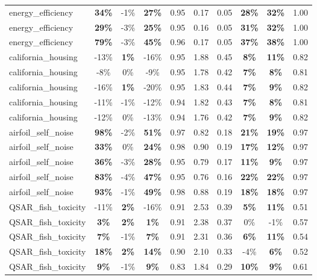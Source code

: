 \begin{table}[!htbp]
\begin{small}
\begin{sc}
{\begin{tabular}{lccccccccc}
energy\_efficiency & \textbf{34\%} & -1\% & \textbf{27\%} & 0.95 & 0.17 & 0.05 & \textbf{28\%} & \textbf{32\%} & 1.00 \\
energy\_efficiency & \textbf{29\%} & -3\% & \textbf{25\%} & 0.95 & 0.16 & 0.05 & \textbf{31\%} & \textbf{32\%} & 1.00 \\
energy\_efficiency & \textbf{79\%} & -3\% & \textbf{45\%} & 0.96 & 0.17 & 0.05 & \textbf{37\%} & \textbf{38\%} & 1.00 \\
california\_housing & -13\% & \textbf{1\%} & -16\% & 0.95 & 1.88 & 0.45 & \textbf{8\%} & \textbf{11\%} & 0.82 \\
california\_housing & -8\% & 0\% & -9\% & 0.95 & 1.78 & 0.42 & \textbf{7\%} & \textbf{8\%} & 0.81 \\
california\_housing & -16\% & \textbf{1\%} & -20\% & 0.95 & 1.83 & 0.44 & \textbf{7\%} & \textbf{9\%} & 0.82 \\
california\_housing & -11\% & -1\% & -12\% & 0.94 & 1.82 & 0.43 & \textbf{7\%} & \textbf{8\%} & 0.81 \\
california\_housing & -12\% & 0\% & -13\% & 0.94 & 1.76 & 0.42 & \textbf{7\%} & \textbf{9\%} & 0.82 \\
airfoil\_self\_noise & \textbf{98\%} & -2\% & \textbf{51\%} & 0.97 & 0.82 & 0.18 & \textbf{21\%} & \textbf{19\%} & 0.97 \\
airfoil\_self\_noise & \textbf{33\%} & 0\% & \textbf{24\%} & 0.98 & 0.90 & 0.19 & \textbf{17\%} & \textbf{12\%} & 0.97 \\
airfoil\_self\_noise & \textbf{36\%} & -3\% & \textbf{28\%} & 0.95 & 0.79 & 0.17 & \textbf{11\%} & \textbf{9\%} & 0.97 \\
airfoil\_self\_noise & \textbf{83\%} & -4\% & \textbf{47\%} & 0.95 & 0.76 & 0.16 & \textbf{22\%} & \textbf{22\%} & 0.97 \\
airfoil\_self\_noise & \textbf{93\%} & -1\% & \textbf{49\%} & 0.98 & 0.88 & 0.19 & \textbf{18\%} & \textbf{18\%} & 0.97 \\
QSAR\_fish\_toxicity & -11\% & \textbf{2\%} & -16\% & 0.91 & 2.53 & 0.39 & \textbf{5\%} & \textbf{11\%} & 0.51 \\
QSAR\_fish\_toxicity & \textbf{3\%} & \textbf{2\%} & \textbf{1\%} & 0.91 & 2.38 & 0.37 & 0\% & -1\% & 0.57 \\
QSAR\_fish\_toxicity & \textbf{7\%} & -1\% & \textbf{7\%} & 0.91 & 2.31 & 0.36 & \textbf{6\%} & \textbf{11\%} & 0.54 \\
QSAR\_fish\_toxicity & \textbf{18\%} & \textbf{2\%} & \textbf{14\%} & 0.90 & 2.10 & 0.33 & -4\% & \textbf{6\%} & 0.52 \\
QSAR\_fish\_toxicity & \textbf{9\%} & -1\% & \textbf{9\%} & 0.83 & 1.84 & 0.29 & \textbf{10\%} & \textbf{9\%} & 0.61 \\
\bottomrule
\end{tabular}
}
\end{sc}
\end{small}
\end{table}
